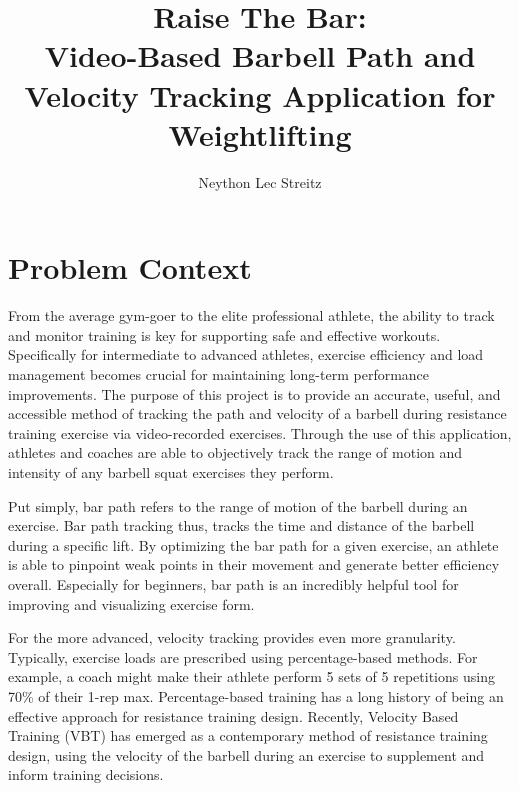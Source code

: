 \documentclass[10pt,twocolumn]{article}
\title{Raise The Bar: \\ Video-Based Barbell Path and Velocity Tracking Application for Weightlifting}
\author{Neython Lec Streitz}
\affiliation{Occidental College}
\begin{document}
\maketitle

\section{Problem Context}
From the average gym-goer to the elite professional athlete, the ability to track and monitor training is key for supporting safe and effective workouts. 
Specifically for intermediate to advanced athletes, exercise efficiency and load management becomes crucial for maintaining long-term performance improvements.
The purpose of this project is to provide an accurate, useful, and accessible method of tracking the path and velocity of a barbell during resistance training exercise via video-recorded exercises.
Through the use of this application, athletes and coaches are able to objectively track the range of motion and intensity of any barbell squat exercises they perform. \par

Put simply, bar path refers to the range of motion of the barbell during an exercise. 
Bar path tracking thus, tracks the time and distance of the barbell during a specific lift. 
By optimizing the bar path for a given exercise, an athlete is able to pinpoint weak points in their movement and generate better efficiency overall. 
Especially for beginners, bar path is an incredibly helpful tool for improving and visualizing exercise form. \par

For the more advanced, velocity tracking provides even more granularity.
Typically, exercise loads are prescribed using percentage-based methods.
For example, a coach might make their athlete perform 5 sets of 5 repetitions using 70\% of their 1-rep max.
Percentage-based training has a long history of being an effective approach for resistance training design.
Recently, Velocity Based Training (VBT) has emerged as a contemporary method of resistance training design, using the velocity of the barbell during an exercise to supplement and inform training decisions. \par
\end{document}
